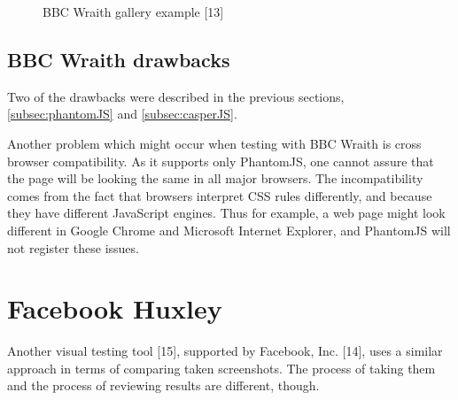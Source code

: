 \documentclass[11pt,oneside,final]{fithesis2}
\begin{document}
  
  \begin{figure}[!htb]
    \begin{center}
    \leavevmode
    \centerline{}
    \end{center}
    \caption{BBC Wraith gallery example [13]}
    \label{fig:bbcGallery} 
  \end{figure}

    \subsection{BBC Wraith drawbacks}
    Two of the drawbacks were described in the previous sections, \ref{subsec:phantomJS} and \ref{subsec:casperJS}.
    
    Another problem which might occur when testing with BBC Wraith is cross browser compatibility. As it supports only PhantomJS, one cannot assure that the page will be 
    looking the same in all major browsers. The incompatibility comes from the fact that browsers interpret CSS rules differently, and because they have different JavaScript engines. 
    Thus for example, a web page might look different in Google Chrome and Microsoft Internet Explorer, and PhantomJS will not register these issues.

  \section{Facebook Huxley}
  Another visual testing tool [15], supported by Facebook, Inc. [14], uses a similar approach in terms of comparing taken screenshots. The process of taking them and the process
  of reviewing results are different, though.
  
\end{document}
